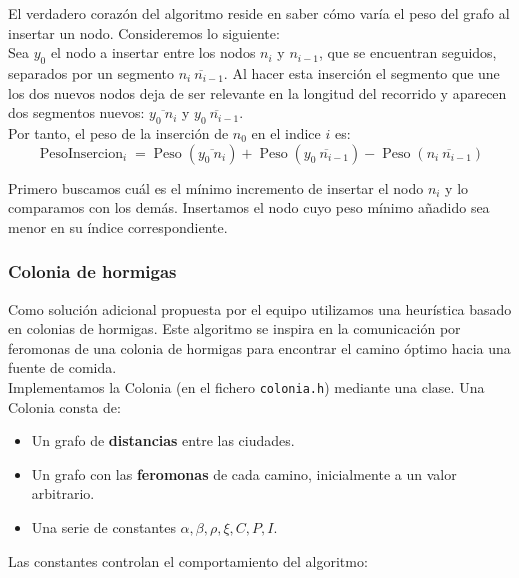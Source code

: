 
\newpage
El verdadero corazón del algoritmo reside en saber cómo varía el peso del grafo al insertar un nodo.
Consideremos lo siguiente: \\

Sea $y_0$ el nodo a insertar entre los nodos $n_i$ y $n_{i-1}$, que se encuentran seguidos, separados por un segmento $\overline{n_i \ n_{i-1}}$. Al hacer esta inserción el segmento que une los dos nuevos nodos deja de ser relevante en la longitud del recorrido y aparecen dos segmentos nuevos: $\overline{y_0 \ n_i}$ y $\overline{y_0 \ n_{i-1}}$.\\

Por tanto, el peso de la inserción de $n_0$ en el indice $i$ es:
$$ \operatorname{PesoInsercion}_i = \operatorname{Peso}(\overline{y_0 \ n_i})+\operatorname{Peso}(\overline{y_0 \ n_{i-1}})-\operatorname{Peso}(\overline{n_i \ n_{i-1}})$$

Primero buscamos cuál es el mínimo incremento de insertar el nodo $n_i$ y lo comparamos con los demás. Insertamos el nodo cuyo peso mínimo añadido sea menor en su índice correspondiente.


\subsubsection{Colonia de hormigas}

Como solución adicional propuesta por el equipo utilizamos una heurística basado en
colonias de hormigas. Este algoritmo se inspira en la comunicación por feromonas
de una colonia de hormigas para encontrar el camino óptimo hacia una fuente de comida. \\

Implementamos la Colonia (en el fichero \texttt{colonia.h}) mediante una clase. Una Colonia consta de:

\begin{itemize}
  \item Un grafo de \textbf{distancias} entre las ciudades.
  \item Un grafo con las \textbf{feromonas} de cada camino, inicialmente a un valor arbitrario.
  \item Una serie de constantes $\alpha, \beta, \rho, \xi, C, P, I$.
\end{itemize}

Las constantes controlan el comportamiento del algoritmo:

